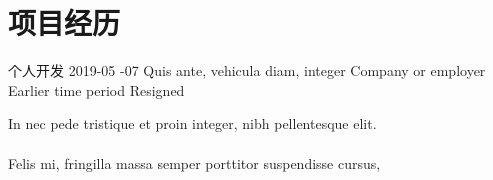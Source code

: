 \section{\kaishu 项目经历}

    {个人开发}
    {2019-05 -07}
    {}
Quis ante, vehicula diam, integer
    {Company or employer}
    {Earlier time period}
    {Resigned}

In nec pede tristique et proin integer, nibh pellentesque elit.
\\\\Felis mi, fringilla massa semper porttitor suspendisse cursus,